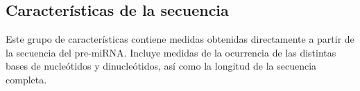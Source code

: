 %
%
\subsection{Características de la secuencia}
%
Este grupo de características contiene medidas obtenidas directamente
a partir de la secuencia del pre-miRNA.  Incluye medidas de la
ocurrencia de las distintas bases de nucleótidos y dinucleótidos, así
como la longitud de la secuencia completa.
